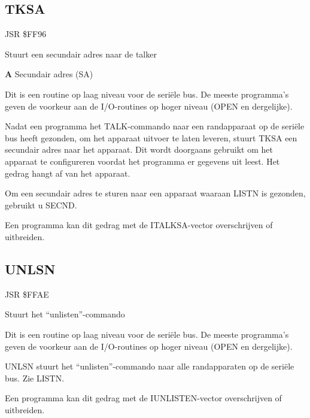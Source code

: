 \subsection{TKSA}
\label{KERNAL Jump Table!TKSA}
\begin{description}[leftmargin=2cm,style=nextline]
    \item [Adres:] JSR \$FF96    \item [Omschrijving:] Stuurt een secundair adres naar de talker    \item [Invoer:]        \textbf{A} Secundair adres (SA)    \item [Opmerkingen:]        Dit is een routine op laag niveau voor de seriële bus. De meeste programma's geven de voorkeur aan de I/O-routines op hoger niveau (OPEN en dergelijke).

        Nadat een programma het TALK-commando naar een randapparaat op de seriële bus heeft gezonden, om het apparaat uitvoer te laten leveren, stuurt TKSA een secundair adres naar het apparaat. Dit wordt doorgaans gebruikt om het apparaat te configureren voordat het programma er gegevens uit leest. Het gedrag hangt af van het apparaat.

        Om een secundair adres te sturen naar een apparaat waaraan LISTN is gezonden, gebruikt u SECND.

        Een programma kan dit gedrag met de ITALKSA-vector overschrijven of uitbreiden.    \item [Voorbeeld:]
\end{description}



\newpage
\subsection{UNLSN}
\label{KERNAL Jump Table!UNLSN}
\begin{description}[leftmargin=2cm,style=nextline]
    \item [Adres:] JSR \$FFAE    \item [Omschrijving:] Stuurt het ``unlisten''-commando    \item [Opmerkingen:]        Dit is een routine op laag niveau voor de seriële bus. De meeste programma's geven de voorkeur aan de I/O-routines op hoger niveau (OPEN en dergelijke).

        UNLSN stuurt het ``unlisten''-commando naar alle randapparaten op de seriële bus. Zie LISTN.

        Een programma kan dit gedrag met de IUNLISTEN-vector overschrijven of uitbreiden.    \item [Voorbeeld:]
\end{description}


